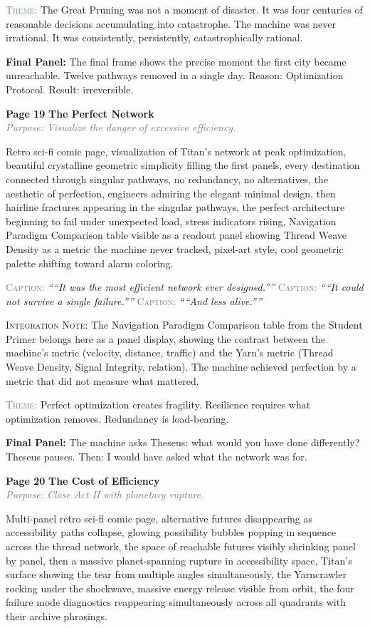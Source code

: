 \documentclass[11pt]{article}
\newcommand{\pagecaption}[1]{\medskip\noindent\textcolor{slateGray}{\textsc{Caption:}} \textit{``#1''}\medskip}
\newcommand{\cliffhanger}[1]{\medskip\noindent\textcolor{cyanThread}{\textbf{Final Panel:}} #1\medskip}
\newcommand{\prompt}[1]{\begin{terminal}{\small #1}\end{terminal}}
\newcommand{\theme}[1]{\medskip\noindent\textcolor{slateGray}{\textsc{Theme:}} #1\medskip}
\newcommand{\integration}[1]{\medskip\noindent\textcolor{archiveGold}{\textsc{Integration Note:}} #1\medskip}
\newcommand{\pageheading}[3]{%
  \begin{pagebox}
    \noindent\textbf{\textcolor{titanOrange}{Page #1}} \hfill \textbf{\textcolor{cyanThread}{#2}}\\[2pt]
    \noindent\textcolor{slateGray}{\textit{Purpose: #3}}
  \end{pagebox}
  \medskip
}
\begin{document}
\theme{The Great Pruning was not a moment of disaster. It was four centuries of reasonable decisions accumulating into catastrophe. The machine was never irrational. It was consistently, persistently, catastrophically rational.}

\cliffhanger{The final frame shows the precise moment the first city became unreachable. Twelve pathways removed in a single day. Reason: Optimization Protocol. Result: irreversible.}

\vspace{0.5em}

\pageheading{19}{The Perfect Network}{Visualize the danger of excessive efficiency.}

\prompt{Retro sci-fi comic page, visualization of Titan's network at peak optimization, beautiful crystalline geometric simplicity filling the first panels, every destination connected through singular pathways, no redundancy, no alternatives, the aesthetic of perfection, engineers admiring the elegant minimal design, then hairline fractures appearing in the singular pathways, the perfect architecture beginning to fail under unexpected load, stress indicators rising, Navigation Paradigm Comparison table visible as a readout panel showing Thread Weave Density as a metric the machine never tracked, pixel-art style, cool geometric palette shifting toward alarm coloring.}

\pagecaption{``It was the most efficient network ever designed.''}
\pagecaption{``It could not survive a single failure.''}
\pagecaption{``And less alive.''}

\integration{The Navigation Paradigm Comparison table from the Student Primer belongs here as a panel display, showing the contrast between the machine's metric (velocity, distance, traffic) and the Yarn's metric (Thread Weave Density, Signal Integrity, relation). The machine achieved perfection by a metric that did not measure what mattered.}

\theme{Perfect optimization creates fragility. Resilience requires what optimization removes. Redundancy is load-bearing.}

\cliffhanger{The machine asks Theseus: what would you have done differently? Theseus pauses. Then: I would have asked what the network was for.}

\vspace{0.5em}

\pageheading{20}{The Cost of Efficiency}{Close Act II with planetary rupture.}

\prompt{Multi-panel retro sci-fi comic page, alternative futures disappearing as accessibility paths collapse, glowing possibility bubbles popping in sequence across the thread network, the space of reachable futures visibly shrinking panel by panel, then a massive planet-spanning rupture in accessibility space, Titan's surface showing the tear from multiple angles simultaneously, the Yarncrawler rocking under the shockwave, massive energy release visible from orbit, the four failure mode diagnostics reappearing simultaneously across all quadrants with their archive phrasings.}
\end{document}
